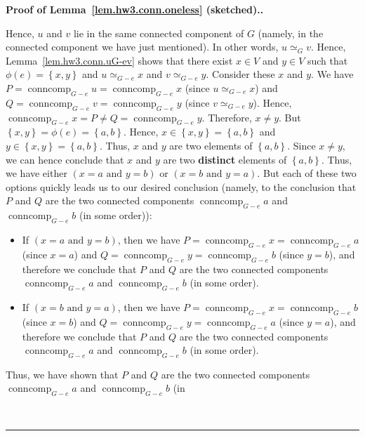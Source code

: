 \documentclass[numbers=enddot,12pt,final,onecolumn,notitlepage]{scrartcl}%
\theoremstyle{definition}
\newenvironment{proof}[1][Proof]{\noindent\textbf{#1.} }{\ \rule{0.5em}{0.5em}}
\newcommand{\conncomp}{\operatorname{conncomp}}
\newcommand{\set}[1]{\left\{ #1 \right\}}
\newcommand{\tup}[1]{\left( #1 \right)}
\begin{document}
\begin{proof}[Proof of Lemma~\ref{lem.hw3.conn.oneless} (sketched).]
\begin{itemize}
{        Hence, $u$ and $v$ lie in the same connected component of $G$
        (namely, in the connected component we have just mentioned).
        In other words, $u \simeq_G v$.
        Hence, Lemma~\ref{lem.hw3.conn.uG-ev} shows that
        there exist $x \in V$ and $y \in V$ such that
        $\phi\tup{e} = \set{x, y}$ and $u \simeq_{G - e} x$ and
        $v \simeq_{G - e} y$.
        Consider these $x$ and $y$.
        We have
        $P = \conncomp_{G - e} u = \conncomp_{G - e} x$ (since
        $u \simeq_{G - e} x$) and
        $Q = \conncomp_{G - e} v = \conncomp_{G - e} y$ (since
        $v \simeq_{G - e} y$).
        Hence,
        $\conncomp_{G - e} x = P \neq Q = \conncomp_{G - e} y$.
        Therefore, $x \neq y$.
        But $\set{x, y} = \phi\tup{e} = \set{a, b}$.
        Hence, $x \in \set{x, y} = \set{a, b}$ and
        $y \in \set{x, y} = \set{a, b}$.
        Thus, $x$ and $y$ are two elements of $\set{a, b}$.
        Since $x \neq y$, we can hence conclude that $x$ and $y$
        are two \textbf{distinct} elements of $\set{a, b}$.
        Thus, we have either $\tup{x = a \text{ and } y = b}$
        or $\tup{x = b \text{ and } y = a}$.
        But each of these two options quickly leads us to our
        desired conclusion (namely, to the conclusion that
        $P$ and $Q$ are the two connected components
        $\conncomp_{G - e} a$ and $\conncomp_{G - e} b$ (in
        some order)):
        \begin{itemize}
        \item If $\tup{x = a \text{ and } y = b}$, then we have
              $P = \conncomp_{G - e} x = \conncomp_{G - e} a$
              (since $x = a$) and
              $Q = \conncomp_{G - e} y = \conncomp_{G - e} b$
              (since $y = b$), and therefore we conclude that
              $P$ and $Q$ are the two connected components
              $\conncomp_{G - e} a$ and $\conncomp_{G - e} b$ (in
              some order).
        \item If $\tup{x = b \text{ and } y = a}$, then we have
              $P = \conncomp_{G - e} x = \conncomp_{G - e} b$
              (since $x = b$) and
              $Q = \conncomp_{G - e} y = \conncomp_{G - e} a$
              (since $y = a$), and therefore we conclude that
              $P$ and $Q$ are the two connected components
              $\conncomp_{G - e} a$ and $\conncomp_{G - e} b$ (in
              some order).
        \end{itemize}
        Thus, we have shown that $P$ and $Q$ are the two
        connected components
        $\conncomp_{G - e} a$ and $\conncomp_{G - e} b$ (in
}
\end{itemize}
\end{proof}
\end{document}
